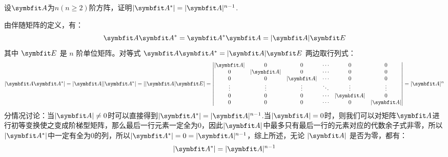 \begin{example}{}{}
    设$\bv{A}$为$n(n\geq 2)$阶方阵，证明$|\bv{A}^{*}|=|\bv{A}|^{n-1}$.
\end{example}
\begin{solution}
由伴随矩阵的定义，有：
\[\bv{A} \bv{A}^{*} = \bv{A}^{*} \bv{A} = |\bv{A}| \bv{E}\]
其中 $\bv{E}$ 是 $n$ 阶单位矩阵。对等式 $\bv{A} \bv{A}^{*} = |\bv{A}| \bv{E}$ 两边取行列式：
\[|\bv{A} \bv{A}^{*}| =|\bv{A}||\bv{A}^{*}|= ||\bv{A}| \bv{E}|=\begin{vmatrix}
|\bv{A}| & 0 & 0 & \cdots & 0 & 0 \\
0 & |\bv{A}| & 0 & \cdots & 0 & 0 \\
0 & 0 & |\bv{A}| & \cdots & 0 & 0 \\
\vdots & \vdots & \vdots & \ddots & \vdots & \vdots \\
0 & 0 & 0 & \cdots & |\bv{A}| & 0 \\
0 & 0 & 0 & \cdots & 0 & |\bv{A}|
\end{vmatrix}=|\bv{A}|^{n}\]
分情况讨论：当$ |\bv{A}|\neq 0$时可以直接得到$|\bv{A}^{*}|=|\bv{A}|^{n-1}$.当$ |\bv{A}|=0$时，则我们可以对矩阵$\bv{A}$进行初等变换使之变成阶梯型矩阵，那么最后一行元素一定全为$0$，因此$|\bv{A}|$中最多只有最后一行的元素对应的代数余子式非零，所以$|\bv{A}^{*}|$中一定有全为$0$的列，所以$|\bv{A}^{*}|=0=|\bv{A}|^{n-1}$，综上所述，无论 $|\bv{A}|$ 是否为零，都有：
\[|\bv{A}^{*}| = |\bv{A}|^{n-1}\]
\end{solution}